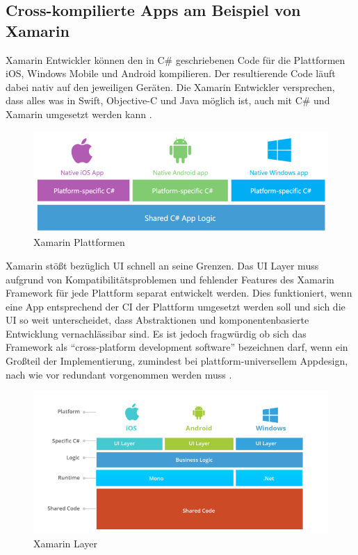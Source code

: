 \subsection{Cross-kompilierte Apps am Beispiel von Xamarin}

Xamarin Entwickler können den in C\# geschriebenen Code für die Plattformen iOS, Windows Mobile und Android kompilieren.
Der resultierende Code läuft dabei nativ auf den jeweiligen Geräten.
Die Xamarin Entwickler versprechen, dass alles was in Swift, Objective-C und
Java möglich ist, auch mit C\# und Xamarin umgesetzt werden kann \cite{projectxamarin}.

\begin{figure}[ht]
 \centering
 \includegraphics[width=0.8\linewidth]{kapitel2/csharp_xamarin.png}
 \caption{Xamarin Plattformen \cite{7Reas20:online}}
\end{figure}
\vspace{1cm}

\noindent
Xamarin stößt bezüglich \ac{UI} schnell an seine Grenzen. Das \ac{UI} Layer muss aufgrund von Kompatibilitätsproblemen und fehlender Features des Xamarin Framework
für jede Plattform separat entwickelt werden. Dies funktioniert, wenn eine App entsprechend der \ac{CI} der Plattform umgesetzt werden soll und sich die \ac{UI} so weit unterscheidet,
dass Abstraktionen und komponentenbasierte Entwicklung vernachlässibar sind. Es ist jedoch fragwürdig ob sich das Framework als ``cross-platform development software'' bezeichnen darf,
wenn ein Großteil der Implementierung, zumindest bei plattform-universellem Appdesign, nach wie vor redundant vorgenommen werden muss \cite{7Reas20:online}.

\begin{figure}[ht]
 \centering
 \includegraphics[width=0.8\linewidth]{kapitel2/xamarin_ui_blocker.png}
 \caption{Xamarin Layer \cite{7Reas20:online}}
\end{figure}

